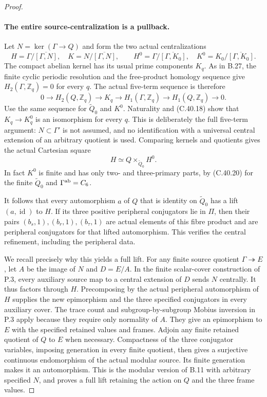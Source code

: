 \begin{proof}
\paragraph{The entire source-centralization is a pullback.}
Let $N=\ker(\Gamma\to Q)$ and form the two actual
centralizations
\[
 H=\Gamma/\overline{[\Gamma,N]},\quad K=N/\overline{[\Gamma,N]},
 \qquad
 H^0=\Gamma/\overline{[\Gamma,K_0]},\quad
 K^0=K_0/\overline{[\Gamma,K_0]}.
                                                        \tag{C.40.19}
\]
The compact abelian kernel has its usual prime
components $K_q$. As in B.27, the finite cyclic
periodic resolution and the free-product homology
sequence give $H_2(\Gamma,\mathbb Z_q)=0$ for every
$q$. The actual five-term sequence is therefore
\[
 0\longrightarrow H_2(Q,\mathbb Z_q)
  \longrightarrow K_q\longrightarrow H_1(\Gamma,\mathbb Z_q)
  \longrightarrow H_1(Q,\mathbb Z_q)\longrightarrow0.
                                                        \tag{C.40.20}
\]
Use the same sequence for $\widetilde Q_0$ and $K^0$.
Naturality and (C.40.18) show that $K_q\to K_q^0$ is
an isomorphism for every $q$. This is deliberately
the full five-term argument: $N\subset\Gamma'$ is
not assumed, and no identification with a universal
central extension of an arbitrary quotient is used.
Comparing kernels and quotients gives the actual
Cartesian square
\[
                    H\simeq Q\mathbin\times_{\widetilde Q_0}H^0.
                                                        \tag{C.40.21}
\]
In fact $K^0$ is finite and has only two- and
three-primary parts, by (C.40.20) for the finite
$\widetilde Q_0$ and $\Gamma^{\rm ab}=C_6$.

It follows that every automorphism $a$ of $Q$ that
is identity on $\widetilde Q_0$ has a lift
$(a,\operatorname{id})$ to $H$. If its three positive
peripheral conjugators lie in $\Pi$, then their pairs
$(b_s,1),(b_r,1),(b_\tau,1)$ are actual elements of
this fibre product and are peripheral conjugators
for that lifted automorphism. This verifies the
central refinement, including the peripheral data.

We recall precisely why this yields a full lift.
For any finite source quotient $\Gamma\twoheadrightarrow E$,
let $A$ be the image of $N$ and $D=E/A$. In the
finite scalar-cover construction of P.3, every
auxiliary source map to a central extension of $D$
sends $N$ centrally. It thus factors through $H$.
Precomposing by the actual peripheral automorphism
of $H$ supplies the new epimorphism and the three
specified conjugators in every auxiliary cover.
The trace count and subgroup-by-subgroup Mobius
inversion in P.3 apply because they require only
normality of $A$. They give an epimorphism to $E$
with the specified retained values and frames.
Adjoin any finite retained quotient of $Q$ to $E$
when necessary. Compactness of the three conjugator
variables, imposing generation in every finite
quotient, then gives a surjective continuous
endomorphism of the actual modular source. Its
finite generation makes it an automorphism. This
is the modular version of B.11 with arbitrary
specified $N$, and proves a full lift retaining
the action on $Q$ and the three frame values.


\end{proof}
